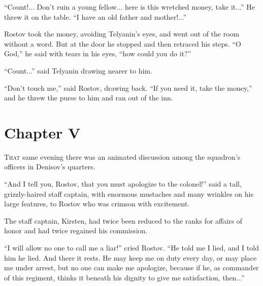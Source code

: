 ``Count!... Don't ruin a young fellow... here is this wretched
money, take it...'' He threw it on the table. ``I have an old
father and mother!...''

Rostov took the money, avoiding Telyanin's eyes, and went out of
the room without a word. But at the door he stopped and then
retraced his steps. ``O God,'' he said with tears in his eyes,
``how could you do it?''

``Count...'' said Telyanin drawing nearer to him.

``Don't touch me,'' said Rostov, drawing back. ``If you need it,
take the money,'' and he threw the purse to him and ran out of
the inn.


\chapter*{Chapter V}
\ifaudio     {} \fi

\lettrine[lines=2, loversize=0.3, lraise=0]{\initfamily T}{hat}
same evening there was an animated discussion among the
squadron's officers in Denisov's quarters.

``And I tell you, Rostov, that you must apologize to the
colonel!'' said a tall, grizzly-haired staff captain, with
enormous mustaches and many wrinkles on his large features, to
Rostov who was crimson with excitement.

The staff captain, Kirsten, had twice been reduced to the ranks
for affairs of honor and had twice regained his commission.

``I will allow no one to call me a liar!'' cried Rostov. ``He
told me I lied, and I told him he lied. And there it rests. He
may keep me on duty every day, or may place me under arrest, but
no one can make me apologize, because if he, as commander of this
regiment, thinks it beneath his dignity to give me satisfaction,
then...''

